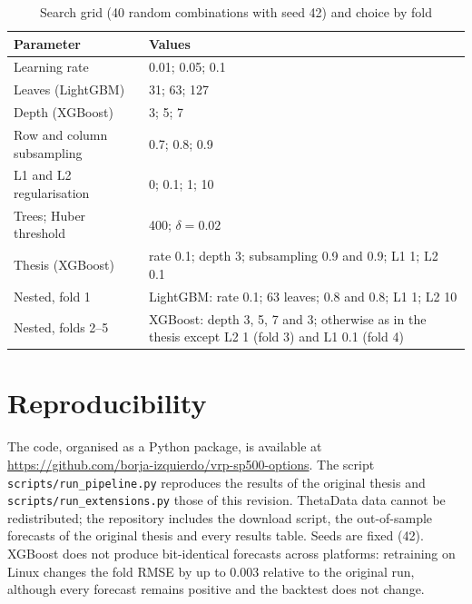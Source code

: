 \documentclass[11pt,a4paper]{article}
\newcommand{\repourl}{\url{https://github.com/borja-izquierdo/vrp-sp500-options}}
\begin{document}
\begin{table}[!htbp]
\centering
\caption{Search grid (40 random combinations with seed 42) and choice by fold}\label{tab:hyper}
\small
\begin{tabularx}{\linewidth}{@{}lX@{}}
\toprule
Parameter & Values \\
\midrule
Learning rate & 0.01; 0.05; 0.1 \\
Leaves (LightGBM) & 31; 63; 127 \\
Depth (XGBoost) & 3; 5; 7 \\
Row and column subsampling & 0.7; 0.8; 0.9 \\
L1 and L2 regularisation & 0; 0.1; 1; 10 \\
Trees; Huber threshold & 400; $\delta=0.02$ \\
\midrule
Thesis (XGBoost) & rate 0.1; depth 3; subsampling 0.9 and 0.9; L1 1; L2 0.1 \\
Nested, fold 1 & LightGBM: rate 0.1; 63 leaves; 0.8 and 0.8; L1 1; L2 10 \\
Nested, folds 2--5 & XGBoost: depth 3, 5, 7 and 3; otherwise as in the thesis except L2 1 (fold 3) and L1 0.1 (fold 4) \\
\bottomrule
\end{tabularx}
\end{table}

\section{Reproducibility}

The code, organised as a Python package, is available at \repourl. The script \texttt{scripts/run\_pipeline.py} reproduces the results of the original thesis and \texttt{scripts/run\_extensions.py} those of this revision. ThetaData data cannot be redistributed; the repository includes the download script, the out-of-sample forecasts of the original thesis and every results table. Seeds are fixed (42). XGBoost does not produce bit-identical forecasts across platforms: retraining on Linux changes the fold RMSE by up to 0.003 relative to the original run, although every forecast remains positive and the backtest does not change.
\end{document}
